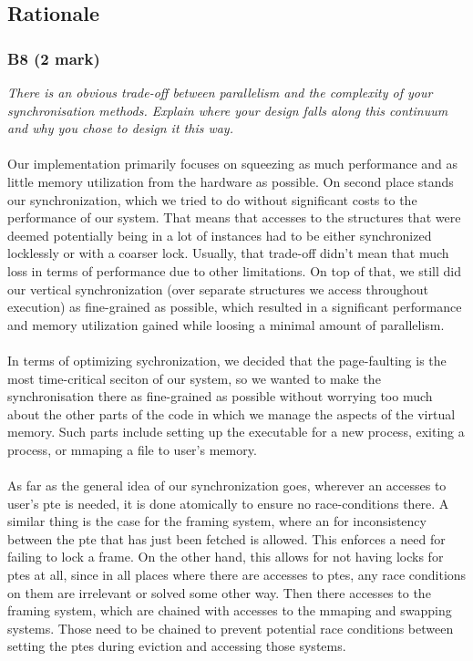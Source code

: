\documentclass{report}
\newcommand{\question}[1]{\textit{#1} \ }
\begin{document}
		\subsection*{Rationale}
			\subsubsection*{B8 (2 mark)}
				\question{There is an obvious trade-off between parallelism and the 
				complexity of your synchronisation methods. Explain where your design 
				falls along this continuum and why you chose to design it this way.}
				\\
				\\Our implementation primarily focuses on squeezing as much performance and
				as little memory utilization from the hardware as possible. On second place
				stands our synchronization, which we tried to do without significant costs
				to the performance of our system. That means that accesses to the structures
				that were deemed potentially being in a lot of instances had to be either
				synchronized locklessly or with a coarser lock. Usually, that trade-off didn't mean
				that much loss in terms of performance due to other limitations. On top of that,
				we still did our vertical synchronization (over separate structures we access
				throughout execution) as fine-grained as possible, which resulted in a significant
				performance and memory utilization gained while loosing a minimal amount of parallelism.
				\\
				\\In terms of optimizing sychronization, we decided that the page-faulting is the
				most time-critical seciton of our system, so we wanted to make the synchronisation
				there as fine-grained as possible without worrying too much about the other parts of the
				code in which we manage the aspects of the virtual memory. Such parts include setting up
				the executable for a new process, exiting a process, or mmaping a file to user's memory.
				\\
				\\ As far as the general idea of our synchronization goes, wherever an accesses to user's pte is needed,
				it is done atomically to ensure no race-conditions there. A similar thing is the case for the framing system,
				where an for inconsistency between the pte that has just been fetched is allowed. This enforces a need for
				failing to lock a frame. On the other hand, this allows for not having locks for ptes at all, since in all places
				where there are accesses to ptes, any race conditions on them are irrelevant or solved some other way. 
				Then there accesses to the framing system, which are chained with accesses to the mmaping and swapping systems.
				Those need to be chained to prevent potential race conditions between setting the ptes during eviction and accessing those systems.
				
\end{document}
